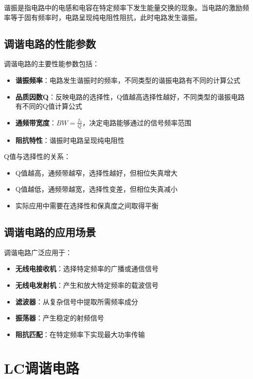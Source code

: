 谐振是指电路中的电感和电容在特定频率下发生能量交换的现象。当电路的激励频率等于固有频率时，电路呈现纯电阻性阻抗，此时电路发生谐振。

\subsection{调谐电路的性能参数}
\label{sec:tuning_parameters}

调谐电路的主要性能参数包括：

\begin{itemize}
    \item \textbf{谐振频率}：电路发生谐振时的频率，不同类型的谐振电路有不同的计算公式
    \item \textbf{品质因数Q}：反映电路的选择性，Q值越高选择性越好，不同类型的谐振电路有不同的Q值计算公式
    \item \textbf{通频带宽度}：$BW = \frac{f_0}{Q}$，决定电路能够通过的信号频率范围
    \item \textbf{阻抗特性}：谐振时电路呈现纯电阻性
\end{itemize}

Q值与选择性的关系：
\begin{itemize}
    \item Q值越高，通频带越窄，选择性越好，但相位失真增大
    \item Q值越低，通频带越宽，选择性变差，但相位失真减小
    \item 实际应用中需要在选择性和保真度之间取得平衡
\end{itemize}

\subsection{调谐电路的应用场景}
\label{sec:tuning_applications}

调谐电路广泛应用于：

\begin{itemize}
    \item \textbf{无线电接收机}：选择特定频率的广播或通信信号
    \item \textbf{无线电发射机}：产生和放大特定频率的载波信号
    \item \textbf{滤波器}：从复杂信号中提取所需频率成分
    \item \textbf{振荡器}：产生稳定的射频信号
    \item \textbf{阻抗匹配}：在特定频率下实现最大功率传输
\end{itemize}

\section{LC调谐电路}
\label{sec:lc_tuning_circuits}

